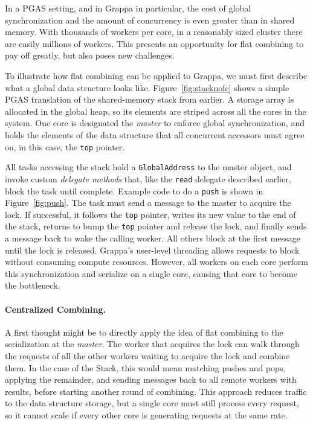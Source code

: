 In a PGAS setting, and in Grappa in particular, the cost of global synchronization and the amount of concurrency is even greater than in shared memory. With thousands of workers per core, in a reasonably sized cluster there are easily millions of workers. This presents an opportunity for flat combining to pay off greatly, but also poses new challenges.


To illustrate how flat combining can be applied to Grappa, we must first describe what a global data structure looks like. Figure~\ref{fig:stacknofc} shows a simple PGAS translation of the shared-memory stack from earlier. A storage array is allocated in the global heap, so its elements are striped across all the cores in the system. One core is designated the \emph{master} to enforce global synchronization, and holds the elements of the data structure that all concurrent accessors must agree on, in this case, the \texttt{top} pointer.

All tasks accessing the stack hold a \texttt{GlobalAddress} to the master object, and invoke custom \emph{delegate methods} that, like the \texttt{read} delegate described earlier, block the task until complete. Example code to do a \texttt{push} is shown in Figure~\ref{fig:push}. The task must send a message to the master to acquire the lock. If successful, it follows the \texttt{top} pointer, writes its new value to the end of the stack, returns to bump the \texttt{top} pointer and release the lock, and finally sends a message back to wake the calling worker. All others block at the first message until the lock is released. Grappa's user-level threading allows requests to block without consuming compute resources. However, all workers on each core perform this synchronization and serialize on a single core, causing that core to become the bottleneck.

\paragraph{Centralized Combining.}
A first thought might be to directly apply the idea of flat combining to the serialization at the \emph{master}. The worker that acquires the lock can walk through the requests of all the other workers waiting to acquire the lock and combine them. In the case of the Stack, this would mean matching pushes and pops, applying the remainder, and sending messages back to all remote workers with results, before starting another round of combining. This approach reduces traffic to the data structure storage, but a single core must still process every request, so it cannot scale if every other core is generating requests at the same rate.

